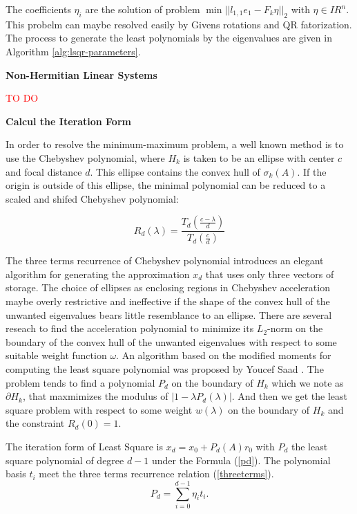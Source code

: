 The coefficients \(\eta_i\) are the solution of problem \(\min ||l_{1,1}e_1-F_k\eta||_2\) with \(\eta \in IR^n\). This probelm can maybe resolved easily by Givens rotations and QR fatorization. The process to generate the least polynomials by the eigenvalues are given in Algorithm \ref{alg:lsqr-parameters}.

\textbf{Non-Hermitian Linear Systems}

\textcolor{red}{TO DO}

\textbf{Calcul the Iteration Form}

In order to resolve the minimum-maximum problem, a well known method is to use the Chebyshev polynomial, where \(H_k\) is taken to be an ellipse with center \(c\) and focal distance \(d\). This ellipse contains the convex hull of \(\sigma_k(A)\). If the origin is outside of this ellipse, the minimal polynomial can be reduced to a scaled and shifed Chebyshev polynomial:

\begin{equation}
R_d(\lambda)=\frac{T_d(\frac{c-\lambda}{d})}{T_d (\frac{c}{d})}
\end{equation}

The three terms recurrence of Chebyshev polynomial introduces an elegant algorithm for generating the approximation \(x_d\) that uses only three vectors of storage. The choice of ellipses as enclosing regions in Chebyshev acceleration maybe overly restrictive and ineffective if the shape of the convex hull of the unwanted eigenvalues bears little resemblance to an ellipse. There are several reseach to find the acceleration polynomial to minimize its $L_2$-norm on the boundary of the convex hull of the unwanted eigenvalues with respect to some suitable weight function $\omega$. An algorithm based on the modified moments  for computing the least square polynomial was proposed by Youcef Saad \cite{saad1987least}. The problem tends to find a polynomial \(P_d\) on the boundary of \(H_k\) which we note as \(\partial H_k\), that maxmimizes the modulus of \(|1-\lambda P_d(\lambda)|\). And then we get the least square problem with respect to some weight \(w(\lambda)\) on the boundary of \(H_k\) and the constraint \(R_d(0)=1\).

The iteration form of Least Square is \(x_d=x_0+P_d(A)r_0\) with \(P_d\) the least square polynomial of degree \(d-1\) under the Formula (\ref{pd}). The polynomial basis \(t_i\) meet the three terms recurrence relation (\ref{threeterms}). 
\begin{equation}
\label{pd}
P_d=\sum_{i=0}^{d-1}\eta_it_i.
\end{equation}

